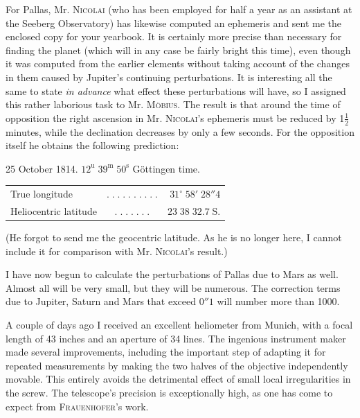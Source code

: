\par\indent For Pallas, Mr. \textsc{Nicolai} (who has been employed for half a year as an assistant at the Seeberg Observatory) has likewise computed an ephemeris and sent me the enclosed copy for your yearbook. It is certainly more precise than necessary for finding the planet (which will in any case be fairly bright this time), even though it was computed from the earlier elements without taking account of the changes in them caused by Jupiter’s continuing perturbations. It is interesting all the same to state \emph{in advance} what effect these perturbations will have, so I assigned this rather laborious task to Mr. \textsc{Möbius}. The result is that around the time of opposition the right ascension in Mr. \textsc{Nicolai}’s ephemeris must be reduced by 1$\frac{1}{2}$ minutes, while the declination decreases by only a few seconds. For the opposition itself he obtains the following prediction:

\begin{center}25 October 1814. $12^{\mathrm u}\;39^{\mathrm m}\;50^{\mathrm s}$ Göttingen time.\end{center}
\begin{center}\fontsize{10}{12}\selectfont\setlength{\tabcolsep}{2pt}\renewcommand{\arraystretch}{1.15}\begin{tabular}{lcr}
True longitude & $.\;.\;.\;.\;.\;.\;.\;.\;.\;.$ & $31^\circ\;58'\;28''4$\\
Heliocentric latitude & $.\;.\;.\;.\;.\;.\;.$ & $23\;38\;32.7\;\mathrm{S.}$\\
\end{tabular}\end{center}

\noindent (He forgot to send me the geocentric latitude. As he is no longer here, I cannot include it for comparison with Mr. \textsc{Nicolai}’s result.)

\par\indent I have now begun to calculate the perturbations of Pallas due to Mars as well. Almost all will be very small, but they will be numerous. The correction terms due to Jupiter, Saturn and Mars that exceed $0''1$ will number more than 1000.

\par\indent A couple of days ago I received an excellent heliometer from Munich, with a focal length of 43 inches and an aperture of 34 lines. The ingenious instrument maker made several improvements, including the important step of adapting it for repeated measurements by making the two halves of the objective independently movable. This entirely avoids the detrimental effect of small local irregularities in the screw. The telescope’s precision is exceptionally high, as one has come to expect from \textsc{Frauenhofer}’s work.
